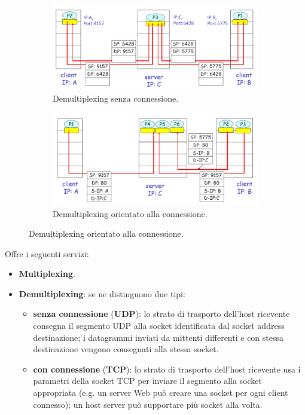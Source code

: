 \documentclass[11pt, italian, openany]{book}
\begin{document}
\begin{sloppypar}
\begin{figure}[h!]
	\begin{subfigure}{0.49 \linewidth} \centering
		\includegraphics[scale=0.24]{images/demultiplexing-senza-connessione.png}
		\caption{Demultiplexing senza connessione.}
	\end{subfigure}
	\begin{subfigure}{0.49 \linewidth} \centering
		\includegraphics[scale=0.24]{images/demultiplexing-orientato-alla-connessione.png}
		\caption{Demultiplexing orientato alla connessione.}
	\end{subfigure}
\end{figure}
Offre i seguenti servizi:
\begin{itemize}[topsep=0pt]
	\itemsep-0.3em
	\item \textbf{Multiplexing}.
	\item \textbf{Demultiplexing}: se ne distinguono due tipi:
	\vspace{-3.5mm}
	\begin{itemize}
		\itemsep-0.3em
		\item \textbf{senza connessione} (\textbf{UDP}): lo strato di trasporto dell'host ricevente consegna il segmento UDP alla socket
		identificata dal socket address destinazione; i datagrammi inviati da mittenti differenti e con stessa destinazione vengono consegnati
		alla stessa socket.
		\item \textbf{con connessione} (\textbf{TCP}): lo strato di trasporto dell'host ricevente usa i parametri della socket TCP per inviare il
		segmento alla socket appropriata (e.g. un server Web pu\`o creare una socket per ogni client connesso); un host server pu\`o supportare
		pi\`u socket alla volta.
	\end{itemize}
	

\end{itemize}
\end{sloppypar}
\end{document}
